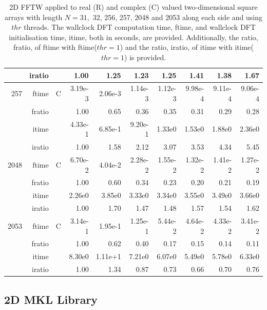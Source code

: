 \documentclass[a4paper]{article}
\begin{document}
\begin{table}
\begin{center}
\begin{tabular}{|r|r|r|r|r|r|r|r|r|r|}
     & iratio & &       1.00 &   1.25 &   1.23 &   1.25 &   1.41 &   1.38 &   1.67      \\ \hline 
   257  & ftime & C  &  3.19e-3 &   2.06e-3 &   1.14e-3 &   1.12e-3 &   9.98e-4 &   9.11e-4 &   9.06e-4   \\ 
      & fratio & &      1.00 &   0.65 &   0.36 &   0.35 &   0.31 &   0.29 &   0.28     \\ 
     & itime & &        4.33e-1 &   6.85e-1 &   9.20e-1 &   1.33e0 &   1.53e0 &   1.88e0 &   2.36e0     \\ 
     & iratio & &       1.00 &   1.58 &   2.12 &   3.07 &   3.53 &   4.34 &   5.45      \\ \hline 
  2048  & ftime & C  &  6.70e-2 &   4.04e-2 &   2.28e-2 &   1.55e-2 &   1.32e-2 &   1.41e-2 &   1.27e-2   \\ 
      & fratio & &      1.00 &   0.60 &   0.34 &   0.23 &   0.20 &   0.21 &   0.19     \\ 
     & itime & &        2.26e0 &   3.85e0 &   3.33e0 &   3.34e0 &   3.55e0 &   3.49e0 &   3.66e0     \\ 
     & iratio & &       1.00 &   1.70 &   1.47 &   1.48 &   1.57 &   1.54 &   1.62      \\ \hline 
  2053  & ftime & C  &  3.14e-1 &   1.95e-1 &   1.25e-1 &   5.44e-2 &   4.64e-2 &   4.33e-2 &   3.41e-2   \\ 
      & fratio & &      1.00 &   0.62 &   0.40 &   0.17 &   0.15 &   0.14 &   0.11     \\ 
     & itime & &        8.30e0 &   1.11e+1 &   7.21e0 &   6.07e0 &   5.49e0 &   5.78e0 &   6.33e0     \\ 
     & iratio & &       1.00 &   1.34 &   0.87 &   0.73 &   0.66 &   0.70 &   0.76      \\ \hline
\end{tabular}
\caption{2D FFTW applied to real (R) and complex (C) valued two-dimensional square arrays with length $N=31,$ 32, 256, 257, 2048 and 2053 along each side and using $thr$ threads. The wallclock DFT computation time, ftime, and wallclock DFT initialisation time, itime, both in seconds, are provided. Additionally,  the ratio, fratio, of ftime  with ftime($thr=1$) and the ratio, iratio, of itime  with itime($thr=1$) is provided. }\label{Tbl:FFTW2d}
\end{center}
\end{table}

\subsection{2D MKL Library}\label{Sec:2DMKL}
\end{document}
